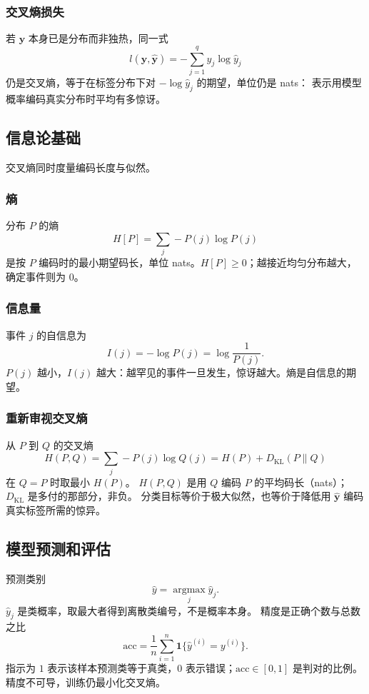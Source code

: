 \subsubsection{交叉熵损失}

若 $\bm{y}$ 本身已是分布而非独热，同一式
\[
l(\bm{y},\hat{\bm{y}})=-\sum_{j=1}^{q}y_{j}\log\hat{y}_{j}
\]
仍是交叉熵，等于在标签分布下对 $-\log\hat{y}_{j}$ 的期望，单位仍是 nats：
表示用模型概率编码真实分布时平均有多惊讶。

\subsection{信息论基础}

交叉熵同时度量编码长度与似然。

\subsubsection{熵}

分布 $P$ 的熵
\[
H[P]=\sum_{j}-P(j)\log P(j)
\]
是按 $P$ 编码时的最小期望码长，单位 nats。$H[P]\ge 0$；越接近均匀分布越大，确定事件则为 $0$。

\subsubsection{信息量}

事件 $j$ 的自信息为
\[
I(j)=-\log P(j)=\log\frac{1}{P(j)}.
\]
$P(j)$ 越小，$I(j)$ 越大：越罕见的事件一旦发生，惊讶越大。熵是自信息的期望。

\subsubsection{重新审视交叉熵}

从 $P$ 到 $Q$ 的交叉熵
\[
H(P,Q)=\sum_{j}-P(j)\log Q(j)=H(P)+D_{\mathrm{KL}}(P\|Q)
\]
在 $Q=P$ 时取最小 $H(P)$。
$H(P,Q)$ 是用 $Q$ 编码 $P$ 的平均码长（nats）；$D_{\mathrm{KL}}$ 是多付的那部分，非负。
分类目标等价于极大似然，也等价于降低用 $\hat{\bm{y}}$ 编码真实标签所需的惊异。

\subsection{模型预测和评估}

预测类别
\[
\hat{y}=\operatorname*{argmax}_{j}\hat{y}_{j}.
\]
$\hat{y}_{j}$ 是类概率，取最大者得到离散类编号，不是概率本身。
精度是正确个数与总数之比
\[
\mathrm{acc}=\frac{1}{n}\sum_{i=1}^{n}\mathbf{1}\{\hat{y}^{(i)}=y^{(i)}\}.
\]
指示为 $1$ 表示该样本预测类等于真类，$0$ 表示错误；$\mathrm{acc}\in[0,1]$ 是判对的比例。
精度不可导，训练仍最小化交叉熵。

